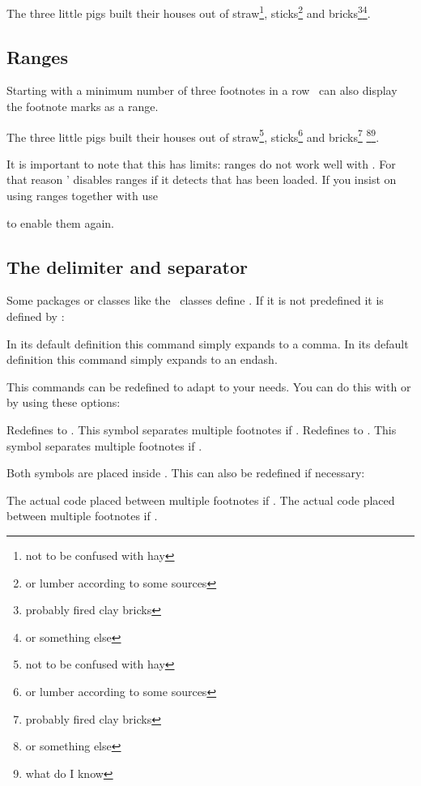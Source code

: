 \documentclass{fnpct-manual}
\begin{document}
\begin{example}
  The three little pigs built their houses out of straw\footnote{not to be
    confused with hay}, sticks\footnote{or lumber according to some sources}
  and bricks\footnote{probably fired clay bricks}\footnote{or something else}.
\end{example}

\subsection{Ranges}
Starting with a minimum number of three footnotes in a row \fnpct\ can also
display the footnote marks as a range.
\begin{example}
  The three little pigs built their houses out of straw\footnote{not to be
    confused with hay}, sticks\footnote{or lumber according to some sources}
  and bricks\footnote{probably fired clay bricks}%
  \footnote{or something else}\footnote{what do I know}.
\end{example}
It is important to note that this has limits: ranges do not work well with
.  For that reason \fnpct' disables ranges if it detects that
 has been loaded.  If you insist on using ranges together with
 use
\begin{options}
    to enable them again.
\end{options}

\subsection{The delimiter and separator}
Some packages or classes like the \KOMAScript\ classes define
.  If it is not predefined it is defined by \fnpct:
\begin{commands}
  \Default{,}
    In its default definition this command simply expands to a comma.
  \Default{--}
    In its default definition this command simply expands to an endash.
\end{commands}
This commands can be redefined to adapt to your needs. You can do this with
 or by using these options:
\begin{options}
    Redefines  to .  This symbol separates
    multiple footnotes if .
  \Default{\code{--}}
    Redefines  to .  This symbol separates
    multiple footnotes if .
\end{options}
Both symbols are placed inside . This can also be
redefined if necessary:
\begin{options}
    The actual code placed between multiple footnotes if .
    The actual code placed between multiple footnotes if .
\end{options}
\end{document}
